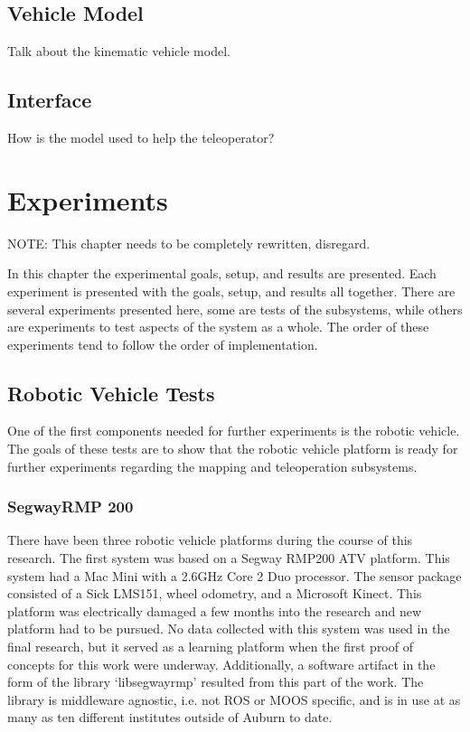 \documentclass[12pt]{report}
\begin{document}
\section{Vehicle Model}
Talk about the kinematic vehicle model.

\section{Interface}
How is the model used to help the teleoperator?


\chapter{Experiments}\label{chap:experiments}
NOTE: This chapter needs to be completely rewritten, disregard.

In this chapter the experimental goals, setup, and results are presented.  Each experiment is presented with the goals, setup, and results all together.  There are several experiments presented here, some are tests of the subsystems, while others are experiments to test aspects of the system as a whole.  The order of these experiments tend to follow the order of implementation.

\section{Robotic Vehicle Tests}
\label{sec:robotic_vehicle}
One of the first components needed for further experiments is the robotic vehicle.  The goals of these tests are to show that the robotic vehicle platform is ready for further experiments regarding the mapping and teleoperation subsystems.

\subsection{SegwayRMP 200}
There have been three robotic vehicle platforms during the course of this research.  The first system was based on a Segway RMP200 ATV platform.  This system had a Mac Mini with a 2.6GHz Core 2 Duo processor.  The sensor package consisted of a Sick LMS151, wheel odometry, and a Microsoft Kinect.  This platform was electrically damaged a few months into the research and new platform had to be pursued.  No data collected with this system was used in the final research, but it served as a learning platform when the first proof of concepts for this work were underway.  Additionally, a software artifact in the form of the library `libsegwayrmp' resulted from this part of the work.  The library is middleware agnostic, i.e. not ROS or MOOS specific, and is in use at as many as ten different institutes outside of Auburn to date.
\end{document}
